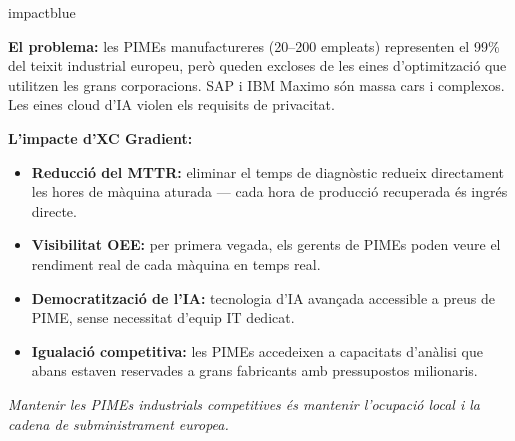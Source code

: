 \documentclass[11pt,a4paper]{article}
\begin{document}
\vspace{0.5em}

\begin{impactcard}{impactblue}

\textbf{El problema:} les PIMEs manufactureres (20--200 empleats) representen el 99\% del teixit industrial europeu, però queden excloses de les eines d'optimització que utilitzen les grans corporacions. SAP i IBM Maximo són massa cars i complexos. Les eines cloud d'IA violen els requisits de privacitat.

\textbf{L'impacte d'XC Gradient:}

\begin{minipage}[t]{0.48\linewidth}
\begin{itemize}[leftmargin=1em,itemsep=1pt,topsep=2pt]
\item \textbf{Reducció del MTTR:} eliminar el temps de diagnòstic redueix directament les hores de màquina aturada --- cada hora de producció recuperada és ingrés directe.
\item \textbf{Visibilitat OEE:} per primera vegada, els gerents de PIMEs poden veure el rendiment real de cada màquina en temps real.
\end{itemize}
\end{minipage}%
\hfill%
\begin{minipage}[t]{0.48\linewidth}
\begin{itemize}[leftmargin=1em,itemsep=1pt,topsep=2pt]
\item \textbf{Democratització de l'IA:} tecnologia d'IA avançada accessible a preus de PIME, sense necessitat d'equip IT dedicat.
\item \textbf{Igualació competitiva:} les PIMEs accedeixen a capacitats d'anàlisi que abans estaven reservades a grans fabricants amb pressupostos milionaris.
\end{itemize}
\end{minipage}

\vspace{0.3em}
\begin{center}
\small\textit{Mantenir les PIMEs industrials competitives és mantenir l'ocupació local i la cadena de subministrament europea.}
\end{center}
\end{impactcard}

\vspace{0.5em}
\end{document}
